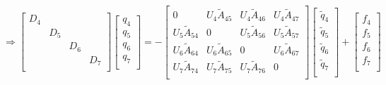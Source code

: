 \begin{equation*}
    \Rightarrow
    \begin{bmatrix}
        D_4    & & & \\
        & D_5    & & \\
        & & D_6    & \\
        & & & D_7    \\
    \end{bmatrix}
    \begin{bmatrix}
        q_4 \\
        q_5 \\
        q_6 \\
        q_7 \\
    \end{bmatrix}
    = -
        \begin{bmatrix}
        0    & U_4\widetilde{A}_{45} & U_4\widetilde{A}_{46} & U_4\widetilde{A}_{47} \\
        U_5\widetilde{A}_{54} & 0 & U_5\widetilde{A}_{56} & U_5\widetilde{A}_{57} \\
        U_6\widetilde{A}_{64} & U_6\widetilde{A}_{65} & 0 & U_6\widetilde{A}_{67} \\
        U_7\widetilde{A}_{74} & U_7\widetilde{A}_{75} & U_7\widetilde{A}_{76} &    0 \\
    \end{bmatrix}
    \begin{bmatrix}
        \widetilde{q}_4 \\
        \widetilde{q}_5 \\
        \widetilde{q}_6 \\
        \widetilde{q}_7 \\
    \end{bmatrix}
    +
    \begin{bmatrix}
        f_4 \\
        f_5 \\
        f_6 \\
        f_7 \\
    \end{bmatrix}
\end{equation*}
